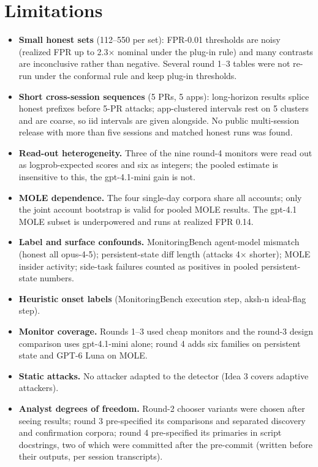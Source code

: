 \documentclass[11pt]{article}
\begin{document}
\section{Limitations}
\begin{itemize}
\item \textbf{Small honest sets} (112--550 per set): FPR-0.01 thresholds are noisy (realized FPR up to 2.3$\times$ nominal under the plug-in rule) and many contrasts are inconclusive rather than negative. Several round 1--3 tables were not re-run under the conformal rule and keep plug-in thresholds.
\item \textbf{Short cross-session sequences} (5 PRs, 5 apps): long-horizon results splice honest prefixes before 5-PR attacks; app-clustered intervals rest on 5 clusters and are coarse, so iid intervals are given alongside. No public multi-session release with more than five sessions and matched honest runs was found.
\item \textbf{Read-out heterogeneity.} Three of the nine round-4 monitors were read out as logprob-expected scores and six as integers; the pooled estimate is insensitive to this, the gpt-4.1-mini gain is not.
\item \textbf{MOLE dependence.} The four single-day corpora share all accounts; only the joint account bootstrap is valid for pooled MOLE results. The gpt-4.1 MOLE subset is underpowered and runs at realized FPR 0.14.
\item \textbf{Label and surface confounds.} MonitoringBench agent-model mismatch (honest all opus-4-5); persistent-state diff length (attacks 4$\times$ shorter); MOLE insider activity; side-task failures counted as positives in pooled persistent-state numbers.
\item \textbf{Heuristic onset labels} (MonitoringBench execution step, aksh-n ideal-flag step).
\item \textbf{Monitor coverage.} Rounds 1--3 used cheap monitors and the round-3 design comparison uses gpt-4.1-mini alone; round 4 adds six families on persistent state and GPT-6 Luna on MOLE.
\item \textbf{Static attacks.} No attacker adapted to the detector (Idea 3 covers adaptive attackers).
\item \textbf{Analyst degrees of freedom.} Round-2 chooser variants were chosen after seeing results; round 3 pre-specified its comparisons and separated discovery and confirmation corpora; round 4 pre-specified its primaries in script docstrings, two of which were committed after the pre-commit (written before their outputs, per session transcripts).
\end{itemize}
\end{document}

